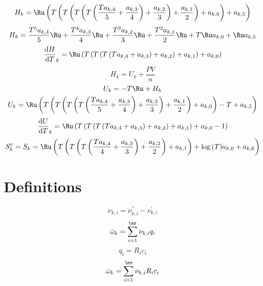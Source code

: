 \documentclass[a4paper,10pt]{article}
\begin{document}
\begin{dmath} H_{k} = \Ru \left(T \left(T \left(T \left(T \left(\frac{T a_{k,4}}{5} + \frac{a_{k,3}}{4}\right) + \frac{a_{k,2}}{3}\right) + \frac{a_{k,1}}{2}\right) + a_{k,0}\right) + a_{k,5}\right)\end{dmath} 
\begin{dmath} H_{k} = \frac{T^{5} a_{k,4}}{5} \Ru + \frac{T^{4} a_{k,3}}{4} \Ru + \frac{T^{3} a_{k,2}}{3} \Ru + \frac{T^{2} a_{k,1}}{2} \Ru + T \Ru a_{k,0} + \Ru a_{k,5}\end{dmath} 
\begin{dmath} \frac{\text{d} H }{\text{d} T }_{k} = \Ru \left(T \left(T \left(T \left(T a_{k,4} + a_{k,3}\right) + a_{k,2}\right) + a_{k,1}\right) + a_{k,0}\right)\end{dmath} 
\begin{dmath} H_k = U_k + \frac{P V}{n}\end{dmath} 
\begin{dmath} U_{k} = - T \Ru + H_{k}\end{dmath} 
\begin{dmath} U_{k} = \Ru \left(T \left(T \left(T \left(T \left(\frac{T a_{k,4}}{5} + \frac{a_{k,3}}{4}\right) + \frac{a_{k,2}}{3}\right) + \frac{a_{k,1}}{2}\right) + a_{k,0}\right) - T + a_{k,5}\right)\end{dmath} 
\begin{dmath} \frac{\text{d} U }{\text{d} T }_{k} = \Ru \left(T \left(T \left(T \left(T a_{k,4} + a_{k,3}\right) + a_{k,2}\right) + a_{k,1}\right) + a_{k,0} - 1\right)\end{dmath} 
\begin{dmath} S_k^{\circ} = S_{k} = \Ru \left(T \left(T \left(T \left(\frac{T a_{k,4}}{4} + \frac{a_{k,3}}{3}\right) + \frac{a_{k,2}}{2}\right) + a_{k,1}\right) + \log{\left (T \right )} a_{k,0} + a_{k,6}\right)\end{dmath} 
\section{Definitions}
\begin{dmath} \nu_{k,i} = \nu^{\prime\prime}_{k,i} - \nu^{\prime}_{k,i}\end{dmath} 
\begin{dmath} \dot{\omega}_{k} = \sum_{i=1}^{\nr} \nu_{k,i} q_{i}\end{dmath} 
\begin{dmath} q_{i} = R_{i} c_{i}\end{dmath} 
\begin{dmath} \dot{\omega}_{k} = \sum_{i=1}^{\nr} \nu_{k,i} R_{i} c_{i}\end{dmath} 
\end{document}
